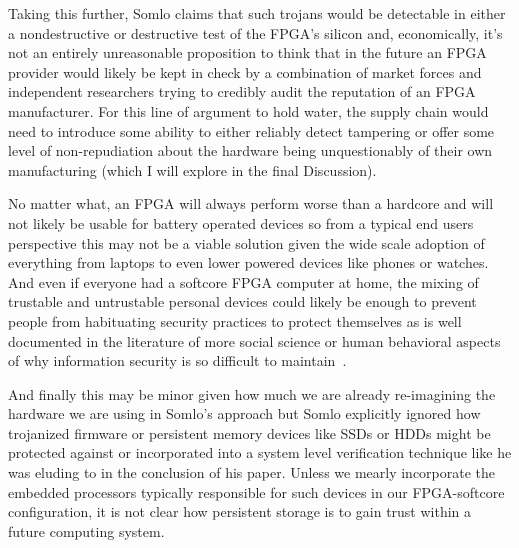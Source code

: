 \documentclass[conference]{IEEEtran}
\begin{document}
	Taking this further, Somlo claims  that such trojans would be detectable in either a nondestructive or destructive test of the FPGA’s silicon and, economically, it’s not an entirely unreasonable proposition to think that in the future an FPGA provider would likely be kept in check by a combination of market forces and independent researchers trying to credibly audit the reputation of an FPGA manufacturer. For this line of argument to hold water, the supply chain would need to introduce some ability to either reliably detect tampering or offer some level of non-repudiation about the hardware being unquestionably of their own manufacturing (which I will explore in the final Discussion).
	
	No matter what, an FPGA will always perform worse than a hardcore and will not likely be usable for battery operated devices so from a typical end users perspective this may not be a viable solution given the wide scale adoption of everything from laptops to even lower powered devices like phones or watches. And even if everyone had a softcore FPGA computer at home,  the mixing of trustable and untrustable personal devices could likely be enough to prevent people from habituating security practices to protect themselves as is well documented in the literature of more social science or human behavioral aspects of why information security is so difficult to maintain~\cite{anderson}.
	
	And finally this may be minor given how much we are already re-imagining the hardware we are using in Somlo’s approach but Somlo explicitly ignored how trojanized firmware or persistent memory devices like SSDs or HDDs might be protected against or incorporated into a system level verification technique like he was eluding to in the conclusion of his paper. Unless we mearly incorporate the embedded processors typically responsible for such devices in our FPGA-softcore configuration, it is not clear how persistent storage is to gain trust within a future computing system.
	
\end{document}
